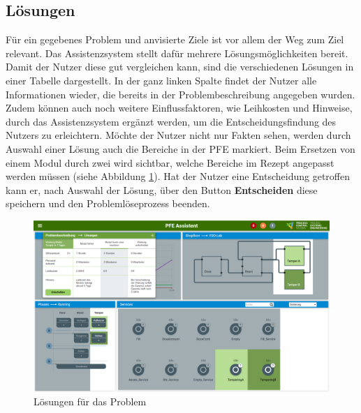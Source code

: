 \subsection{Lösungen}
\label{4:pD-Loesungen}
Für ein gegebenes Problem und anvisierte Ziele ist vor allem der Weg zum Ziel relevant. Das Assistenzsystem stellt dafür mehrere Lösungsmöglichkeiten bereit. Damit der Nutzer diese gut vergleichen kann, sind die verschiedenen Lösungen in einer Tabelle dargestellt. In der ganz linken Spalte findet der Nutzer alle Informationen wieder, die bereits in der Problembeschreibung angegeben wurden. Zudem können auch noch weitere Einflussfaktoren, wie Leihkosten und Hinweise, durch das Assistenzsystem ergänzt werden, um die Entscheidungsfindung des Nutzers zu erleichtern. Möchte der Nutzer nicht nur Fakten sehen, werden durch Auswahl einer Lösung auch die Bereiche in der PFE markiert. Beim Ersetzen von einem Modul durch zwei wird sichtbar, welche Bereiche im Rezept angepasst werden müssen (siehe Abbildung \ref{pic:pD-Loesungen}). Hat der Nutzer eine Entscheidung getroffen kann er, nach Auswahl der Lösung, über den Button \textbf{Entscheiden} diese speichern und den Problemlöseprozess beenden.
\begin{figure}[htbp]
\centering
\includegraphics[angle=90,scale=0.47]{DA_files/Bilder/Konzept/Skizze-Loesungen-PFE.png}
\caption{Lösungen für das Problem}
\label{pic:pD-Loesungen}
\end{figure}

